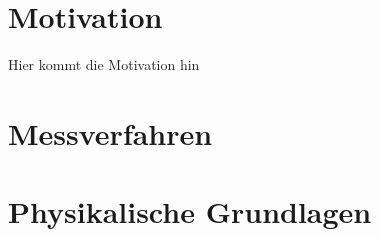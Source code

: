 
\section{Motivation}
Hier kommt die Motivation hin
\section{Messverfahren}

\section{Physikalische Grundlagen}

